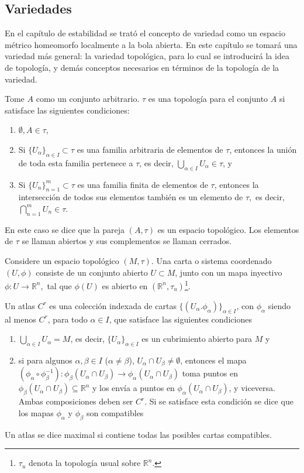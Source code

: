 \subsection{Variedades}
En el capítulo de estabilidad se trató el concepto de variedad como un espacio métrico homeomorfo localmente a la bola abierta. En este capítulo se tomará una variedad más general: la variedad topológica, para lo cual se introducirá la idea de topología, y demás conceptos necesarios en términos de la topología de la variedad.
\begin{defi}
	Tome $A$ como un conjunto arbitrario. $\tau$ es una topología para el conjunto $A$ si satisface las siguientes condiciones:
	\begin{enumerate}
		\item $\emptyset,A\in\tau$,
		\item Si $\{U_\alpha\}_{\alpha\in I}\subset\tau$ es una familia arbitraria de elementos de $\tau$, entonces la unión de toda esta familia pertenece a $\tau$, es decir, $\bigcup_{\alpha\in I} U_\alpha\in\tau$, y
		\item Si $\{U_n\}_{n=1}^m\subset\tau$ es una familia finita de elementos de $\tau$, entonces la intersección de todos sus elementos también es un elemento de $\tau,$ es decir, $\bigcap_{n=1}^m U_n\in\tau$.
	\end{enumerate}
	En este caso se dice que la pareja $(A,\tau)$ es un espacio topológico. Los elementos de $\tau$ se llaman abiertos y sus complementos se llaman cerrados.
\end{defi}
\begin{defi}
	Considere un espacio topológico $(M,\tau)$. Una carta o sistema coordenado $(U, \phi)$ consiste de un conjunto abierto $U\subset M$, junto con un mapa inyectivo $\phi:U\rightarrow\mathbb{R}^n,$ tal que $\phi(U)$ es abierto en $(\mathbb{R}^n, \tau_u)$\footnote{$\tau_u$ denota la topología usual sobre $\mathbb{R}^n$.}.
\end{defi}
\begin{defi}[Atlas $C^r$]
	Un atlas $C^r$ es una colección indexada de cartas $\{(U_\alpha.\phi_\alpha)\}_{\alpha\in I}$, con $\phi_\alpha$ siendo al menos $C^r$, para todo $\alpha\in I$, que satisface las siguientes condiciones
	\begin{enumerate}
		\item $\bigcup_{\alpha\in I} U_\alpha=M$, es decir, $\{U_\alpha\}_{\alpha\in I}$ es un cubrimiento abierto para $M$ y
		\item si para algunos $\alpha,\beta\in I$ ($\alpha\neq\beta$), $U_\alpha\cap U_\beta\neq\emptyset$, entonces el mapa $(\phi_\alpha\circ\phi_\beta^{-1}):\phi_\beta(U_\alpha\cap U_\beta)\rightarrow\phi_\alpha(U_\alpha\cap U_\beta)$ toma puntos en $\phi_\beta(U_\alpha\cap U_\beta)\subseteq\mathbb{R}^n$ y los envía a puntos en $\phi_\alpha(U_\alpha\cap U_\beta)$, y viceversa. Ambas composiciones deben ser $C^r$. Si se satisface esta condición se dice que los mapas $\phi_\alpha$ y $\phi_\beta$ son compatibles
	\end{enumerate}
	
	Un atlas se dice maximal si contiene todas las posibles cartas compatibles.
\end{defi}
